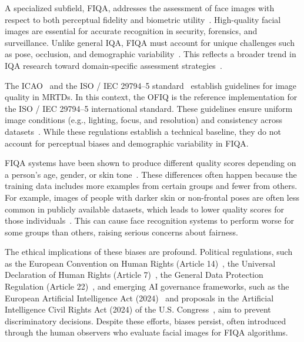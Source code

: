 A specialized subfield, \acf{FIQA}, addresses the assessment of face images with respect to both perceptual fidelity and biometric utility~\cite{survey2022fiqa}. High-quality facial images are essential for accurate recognition in security, forensics, and surveillance. Unlike general \acs{IQA}, \acs{FIQA} must account for unique challenges such as pose, occlusion, and demographic variability~\cite{abed2025fiqabiometric, survey2017fiqaattack}. This reflects a broader trend in \acs{IQA} research toward domain-specific assessment strategies~\cite{survey2020zhai}.

The \acf{ICAO}~\cite{icao2015} and the \acf{ISO} / \acf{IEC} 29794--5 standard~\cite{iso2010iec} establish guidelines for image quality in \acf{MRTDs}. In this context, the \acf{OFIQ} is the reference implementation for the \acs{ISO} / \acs{IEC} 29794--5  international standard. These guidelines ensure uniform image conditions (e.g., lighting, focus, and resolution) and consistency across datasets~\cite{bsi2024ofiq}. While these regulations establish a technical baseline, they do not account for perceptual biases and demographic variability in \acs{FIQA}.

\acs{FIQA} systems have been shown to produce different quality scores depending on a person's age, gender, or skin tone~\cite{babnik2022bias, terhorst2020bias, babnik2022bias}. These differences often happen because the training data includes more examples from certain groups and fewer from others. For example, images of people with darker skin or non-frontal poses are often less common in publicly available datasets, which leads to lower quality scores for those individuals~\cite{kanwisher2006fusiform}. This can cause face recognition systems to perform worse for some groups than others, raising serious concerns about fairness.

The ethical implications of these biases are profound. Political regulations, such as the European Convention on Human Rights (Article 14)~\cite{eu1950art14}, the Universal Declaration of Human Rights (Article 7)~\cite{un1947art7}, the General Data Protection Regulation (Article 22)~\cite{eu2016art22}, and emerging AI governance frameworks, such as the European Artificial Intelligence Act (2024)~\cite{eu2024ai} and proposals in the Artificial Intelligence Civil Rights Act (2024) of the U.S. Congress~\cite{us2024ai}, aim to prevent discriminatory decisions. Despite these efforts, biases persist, often introduced through the human observers who evaluate facial images for \acs{FIQA} algorithms.

